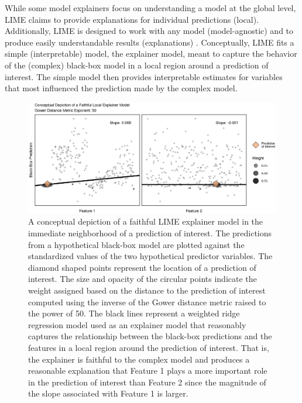 \documentclass[AMS,STIX2COL]{WileyNJD-v2}\usepackage[]{graphicx}\usepackage[]{color}
\newenvironment{knitrout}{}{} %
\begin{document}
While some model explainers focus on understanding a model at the global level, LIME claims to provide explanations for individual predictions (local). Additionally, LIME is designed to work with any model (model-agnostic) and to produce easily understandable results (explanations) \citep{ribeiro:2016}. Conceptually, LIME fits a simple (interpretable) model, the explainer model,  meant to capture the behavior of the (complex) black-box model in a local region around a prediction of interest. The  simple model then provides interpretable estimates for variables that most influenced the prediction made by the complex model.





\begin{figure}[!thp]
\begin{knitrout}
\color{fgcolor}

{\centering \includegraphics[width=6.5in]{figure-01-1} 

}



\end{knitrout}
\caption{A conceptual depiction of a faithful LIME explainer model in the immediate neighborhood of a prediction of interest. The predictions from a hypothetical black-box model are plotted against the standardized values of the two hypothetical predictor variables. The diamond shaped points represent the location of a prediction of interest. The size and opacity of the circular points indicate the weight assigned based on the distance to the prediction of interest computed using the inverse of the Gower distance metric raised to the power of 50. The black lines represent  a weighted ridge regression model used as an explainer model that reasonably captures the relationship between the black-box predictions and the features in a local region around the prediction of interest. That is, the explainer is faithful to the complex model and produces a reasonable explanation that Feature 1 plays a more important role in the prediction of interest than Feature 2 since the magnitude of the slope associated with Feature 1 is larger.}
\label{fig:figure-01}


\end{figure}
\end{document}
